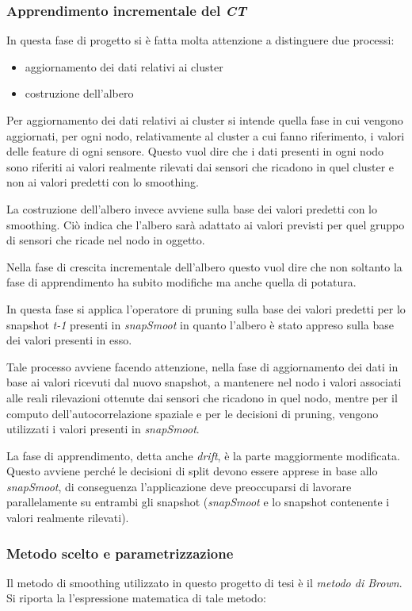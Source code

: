 \documentclass[12pt,a4paper,oneside,openright]{book}
\begin{document}
\subsubsection{Apprendimento incrementale del \textit{CT}}
In questa fase di progetto si è fatta molta attenzione a distinguere due processi: 
\begin{itemize}
\item aggiornamento dei dati relativi ai cluster
\item costruzione dell'albero
\end{itemize}
Per aggiornamento dei dati relativi ai cluster si intende quella fase in cui vengono aggiornati, per ogni nodo, relativamente al cluster a cui fanno riferimento, i valori delle feature di ogni sensore. Questo vuol dire che i dati presenti in ogni nodo sono riferiti ai valori realmente rilevati dai sensori che ricadono in quel cluster e non ai valori predetti con lo smoothing.

La costruzione dell'albero invece avviene sulla base dei valori predetti con lo smoothing. Ciò indica che l'albero sarà adattato ai valori previsti per quel gruppo di sensori che ricade nel nodo in oggetto. 

Nella fase di crescita incrementale dell'albero questo vuol dire che non soltanto la fase di apprendimento ha subito modifiche ma anche quella di potatura. 

In questa fase si applica l'operatore di pruning sulla base dei valori predetti per lo snapshot \textit{t-1} presenti in \textit{snapSmoot} in quanto l'albero è stato appreso sulla base dei valori presenti in esso. 

Tale processo avviene facendo attenzione, nella fase di aggiornamento dei dati in base ai valori ricevuti dal nuovo snapshot, a mantenere nel nodo i valori associati alle reali rilevazioni ottenute dai sensori che ricadono in quel nodo, mentre per il computo dell'autocorrelazione spaziale e per le decisioni di pruning, vengono utilizzati i valori presenti in \textit{snapSmoot}.

La fase di apprendimento, detta anche \textit{drift}, è la parte maggiormente modificata. Questo avviene perché le decisioni di split devono essere apprese in base allo \textit{snapSmoot}, di conseguenza l'applicazione deve preoccuparsi di lavorare parallelamente su entrambi gli snapshot (\textit{snapSmoot} e lo snapshot contenente i valori realmente rilevati).

\subsubsection{Metodo scelto e parametrizzazione}
Il metodo di smoothing utilizzato in questo progetto di tesi è il \textit{metodo di Brown}. Si riporta la l'espressione matematica di tale metodo:
\end{document}
